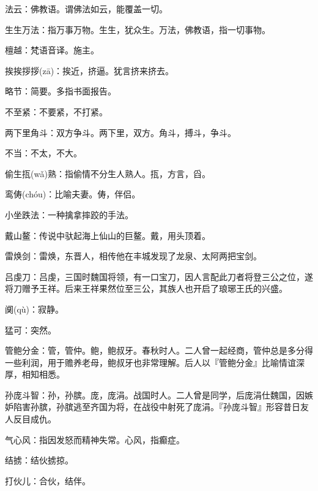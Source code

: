 \startbuffer[2139]
法云：佛教语。谓佛法如云，能覆盖一切。
\stopbuffer


\startbuffer[2140]
生生万法：指万事万物。生生，犹众生。万法，佛教语，指一切事物。
\stopbuffer


\startbuffer[2141]
檀越：梵语音译。施主。
\stopbuffer


\startbuffer[2142]
挨挨拶拶(zā)：挨近，挤逼。犹言挤来挤去。
\stopbuffer


\startbuffer[2143]
略节：简要。多指书面报告。
\stopbuffer


\startbuffer[2144]
不至紧：不要紧，不打紧。
\stopbuffer


\startbuffer[2145]
两下里角斗：双方争斗。两下里，双方。角斗，搏斗，争斗。
\stopbuffer


\startbuffer[2146]
不当：不太，不大。
\stopbuffer


\startbuffer[2147]
偷生㧚(wǎ)熟：指偷情不分生人熟人。㧚，方言，舀。
\stopbuffer


\startbuffer[2148]
鸾俦(chóu)：比喻夫妻。俦，伴侣。
\stopbuffer


\startbuffer[2149]
小坐跌法：一种擒拿摔跤的手法。
\stopbuffer


\startbuffer[2150]
戴山鳌：传说中驮起海上仙山的巨鳌。戴，用头顶着。
\stopbuffer


\startbuffer[2151]
雷焕剑：雷焕，东晋人，相传他在丰城发现了龙泉、太阿两把宝剑。
\stopbuffer


\startbuffer[2152]
吕虔刀：吕虔，三国时魏国将领，有一口宝刀，因人言配此刀者将登三公之位，遂将刀赠予王祥。后来王祥果然位至三公，其族人也开启了琅琊王氏的兴盛。
\stopbuffer


\startbuffer[2153]
阒(qù)：寂静。
\stopbuffer


\startbuffer[2154]
猛可：突然。
\stopbuffer


\startbuffer[2155]
管鲍分金：管，管仲。鲍，鲍叔牙。春秋时人。二人曾一起经商，管仲总是多分得一些利润，用于赡养老母，鲍叔牙也非常理解。后人以『管鲍分金』比喻情谊深厚，相知相悉。
\stopbuffer


\startbuffer[2156]
孙庞斗智：孙，孙膑。庞，庞涓。战国时人。二人曾是同学，后庞涓仕魏国，因嫉妒陷害孙膑，孙膑逃至齐国为将，在战役中射死了庞涓。『孙庞斗智』形容昔日友人反目成仇。
\stopbuffer


\startbuffer[2157]
气心风：指因发怒而精神失常。心风，指癫症。
\stopbuffer


\startbuffer[2158]
结掳：结伙掳掠。
\stopbuffer


\startbuffer[2159]
打伙儿：合伙，结伴。
\stopbuffer


